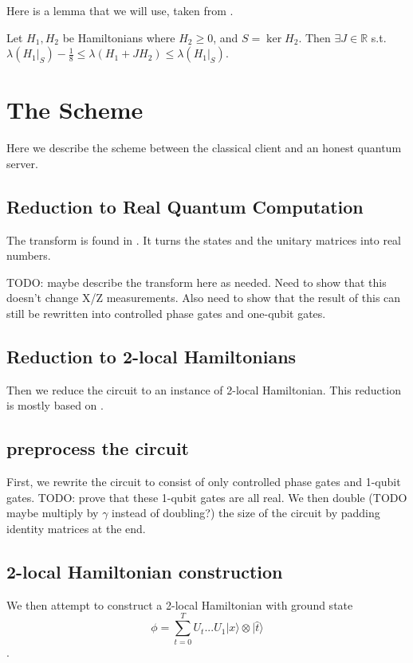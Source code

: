 \documentclass{article}
\theoremstyle{definition}
\begin{document}
Here is a lemma that we will use, taken from \cite{quant-ph/0406180}.

Let $H_1, H_2$ be Hamiltonians where $H_2\geq0$, and $S=\ker H_2$.
Then $\exists J\in\mathbb{R}$ s.t.
$\lambda(H_1\big|_S)-\frac{1}{8}\leq
	\lambda(H_1+JH_2)\leq\lambda(H_1\big|_S)$.

\section{The Scheme}

Here we describe the scheme between the classical client and an honest quantum server.

\subsection{Reduction to Real Quantum Computation}

The transform is found in \cite{1109.0795}. It turns the states and the unitary matrices into real numbers.

TODO: maybe describe the transform here as needed. Need to show that this doesn't change X/Z measurements. Also need to show that the result of this can still be rewritten into controlled phase gates and one-qubit gates.

\subsection{Reduction to 2-local Hamiltonians}

Then we reduce the circuit to an instance of 2-local Hamiltonian. This reduction is mostly based on \cite{quant-ph/0406180}.

\subsection{preprocess the circuit}

First, we rewrite the circuit to consist of only controlled phase gates and 1-qubit gates. TODO: prove that these 1-qubit gates are all real. We then double (TODO maybe multiply by $\gamma$ instead of doubling?) the size of the circuit by padding identity matrices at the end.

\subsection{2-local Hamiltonian construction}

We then attempt to construct a 2-local Hamiltonian with ground state $$\phi=\sum_{t=0}^TU_t...U_1|x\rangle\otimes|\hat{t}\rangle$$.
\end{document}
